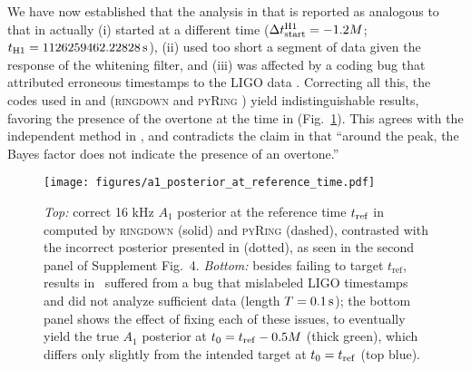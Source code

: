 \documentclass[aps,prd,twocolumn,superscriptaddress,preprintnumbers,floatfix,nofootinbib]{revtex4-2}
\begin{document}
We have now established that the analysis in \cite{Cotesta:2022pci} that is reported as
analogous to that in \cite{Isi:2019aib} actually
(i) started at a different time ($\Delta t_{\rm start}^{\rm H1} = -1.2 M$; $t_{\rm H1} = 1126259462.22828 \, \mathrm{s}$),
(ii) used too short a segment of data given the response of the whitening filter, and
(iii) was affected by a coding bug that attributed erroneous timestamps to the LIGO data \cite{bug}.
Correcting all this, the codes used in
\cite{Isi:2022mhy} and \cite{Cotesta:2022pci} (\textsc{ringdown} \cite{ringdown}
and \textsc{pyRing} \cite{pyRing_soft}) yield indistinguishable
results, favoring the presence of the overtone at the time in \cite{Isi:2019aib}
(Fig.~\ref{fig:reftime}). This agrees with the independent
method in \cite{Finch:2022ynt}, and contradicts the claim in
\cite{Cotesta:2022pci} that ``around the peak, the Bayes factor does not
indicate the presence of an overtone.''

\begin{figure}
  \texttt{[image: figures/a1\_posterior\_at\_reference\_time.pdf]}
  \caption{\emph{Top:} correct 16 kHz $A_1$ posterior at the reference time $t_{\rm ref}$ in \cite{Isi:2019aib} computed by \textsc{ringdown} (solid) and \textsc{pyRing} (dashed), contrasted with the incorrect posterior presented in \cite{Cotesta:2022pci} (dotted), as seen in the second panel of Supplement Fig.~4.
  \emph{Bottom:}
  besides failing to target $t_\mathrm{ref}$, results in~\cite{Cotesta:2022pci} suffered from a bug that mislabeled LIGO timestamps and did not analyze sufficient data (length $T = 0.1\,{\rm s}$); the bottom panel shows the effect of fixing each of these issues, to eventually yield the true $A_1$ posterior at $t_0 = t_{\rm ref} - 0.5 M$ (thick green), which differs only slightly from the intended target at $t_0 = t_{\rm ref}$ (top blue).
  \label{fig:reftime}
}
\end{figure}
\end{document}
